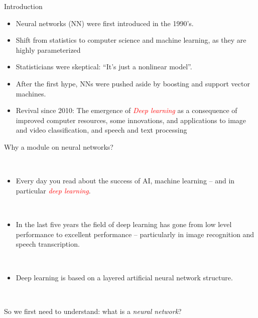 \documentclass[10pt,ignorenonframetext,]{beamer}
\providecommand{\tightlist}{%
  \setlength{\itemsep}{0pt}\setlength{\parskip}{0pt}}
\begin{document}
\begin{frame}{Introduction}
\protect\hypertarget{introduction}{}

\begin{itemize}
\item
  Neural networks (NN) were first introduced in the 1990's.
\item
  Shift from statistics to computer science and machine learning, as
  they are highly parameterized
\item
  Statisticians were skeptical: ``It's just a nonlinear model''.
\item
  After the first hype, NNs were pushed aside by boosting and support
  vector machines.
\item
  Revival since 2010: The emergence of
  \emph{\textcolor{red}{Deep learning}} as a consequence of improved
  computer resources, some innovations, and applications to image and
  video classification, and speech and text processing
\end{itemize}

\end{frame}

\begin{frame}

\begin{block}{Why a module on neural networks?}

\(~\)

\begin{itemize}
\tightlist
\item
  Every day you read about the success of AI, machine learning -- and in
  particular \emph{\textcolor{red}{deep learning}}.
\end{itemize}

\(~\)

\begin{itemize}
\tightlist
\item
  In the last five years the field of deep learning has gone from low
  level performance to excellent performance -- particularly in image
  recognition and speech transcription.
\end{itemize}

\(~\)

\begin{itemize}
\tightlist
\item
  Deep learning is based on a layered artificial neural network
  structure.
\end{itemize}

\(~\)

So we first need to understand: what is a \emph{neural network}?

\end{block}

\end{frame}
\end{document}
